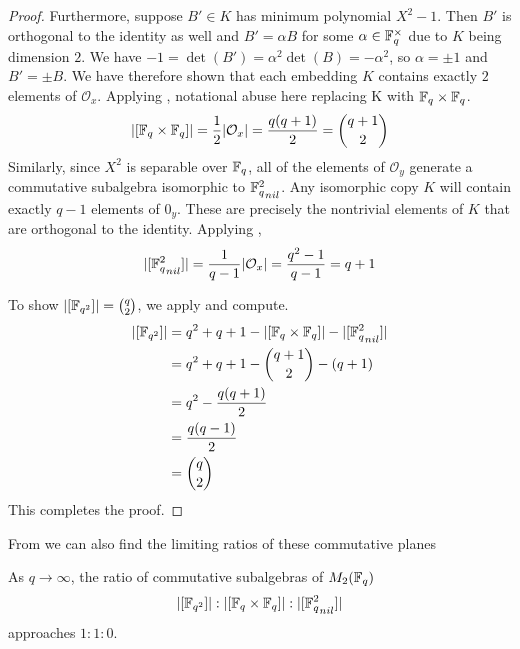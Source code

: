 \documentclass{amsart}
\begin{document}
\begin{proof}
    Furthermore, suppose $B' \in K$ has minimum polynomial $X^2 - 1$. Then $B'$ is orthogonal to the identity as well and $B' = \alpha B$ for some $\alpha \in \protect\mathbb{F}_q^{\times}$ due to $K$ being dimension $2$. We have $-1 = \det(B') = \alpha^2 \det(B) = -\alpha^2$, so $\alpha = \pm 1$ and $B' = \pm B$. We have therefore shown that each embedding $K$ contains exactly $2$ elements of $\mathcal{O}_x$. Applying ,
    {\color{blue} notational abuse here replacing K with $\protect\mathbb{F}_q \times \protect\mathbb{F}_q$}. 
    \begin{align*}
        |[\protect\mathbb{F}_q \times \protect\mathbb{F}_q]| = \frac{1}{2}|\mathcal{O}_x|
                  = \frac{q(q+1)}{2}
                  = \binom{q + 1}{2}
    \end{align*}
    Similarly, since $X^2$ is separable over $\protect\mathbb{F}_q$, all of the elements of $\mathcal{O}_y$ generate a commutative subalgebra isomorphic to ${\protect\mathbb{F}_q^2}_{nil}$. Any isomorphic copy $K$ will contain exactly $q - 1$ elements of $\mathcal{0}_y$. These are precisely the nontrivial elements of $K$ that are orthogonal to the identity. Applying ,
    \begin{align*}
        |[{\protect\mathbb{F}_q^2}_{nil}]| = \frac{1}{q-1}|\mathcal{O}_x|
                            = \frac{q^2-1}{q-1}
                            = q+1
    \end{align*}

    To show $|[\protect\mathbb{F}_{q^2}]| = \binom{q}{2}$, we apply  and compute.
    \begin{align*}
        |[\protect\mathbb{F}_{q^2}]| &= q^2 + q + 1 - |[\protect\mathbb{F}_q \times \protect\mathbb{F}_q]| - |[{\protect\mathbb{F}_q^2}_{nil}]| \\
                      &= q^2 + q + 1 - \binom{q+1}{2} - (q+1) \\
                      &= q^2 - \frac{q(q+1)}{2} \\
                      &= \frac{q(q-1)}{2} \\
                      &= \binom{q}{2}
    \end{align*}
    This completes the proof.
\end{proof}
From  we can also find the limiting ratios of these commutative planes
\begin{cor}
    As $q \rightarrow \infty$, the ratio of commutative subalgebras of $M_2(\protect\mathbb{F}_q)$
    \begin{align*}
        |[\protect\mathbb{F}_{q^2}]| : |[\protect\mathbb{F}_q \times \protect\mathbb{F}_q]| : |[{\protect\mathbb{F}_q^2}_{nil}]|
    \end{align*}
    approaches $1 : 1 : 0$.
\end{cor}
\end{document}
